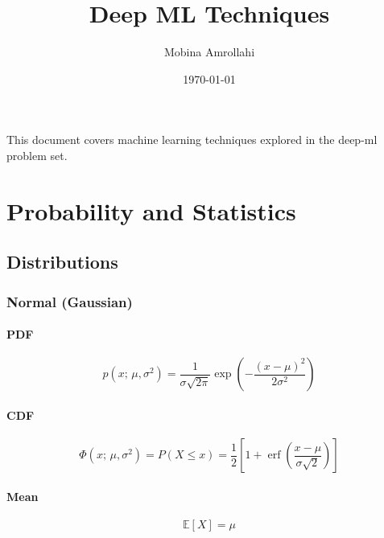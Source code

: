 \documentclass{article}
\title{Deep ML Techniques}
\author{Mobina Amrollahi}
\date{\today}
\begin{document}
\maketitle

\tableofcontents

This document covers machine learning techniques explored in the deep-ml problem set.

\section{Probability and Statistics}
\label{sec:prob-stat}

\subsection{Distributions}
\label{subsec:prob-stat:dist}

\subsubsection{Normal (Gaussian)}
\label{subsubsec:prob-stat:dist:norm}

\paragraph{PDF}
\label{para:prob-stat:dist:norm:pdf}
\begin{equation}
    \label{eq:norm-pdf}
    p(x;\, \mu, \sigma^2) = \frac{1}{\sigma\sqrt{2\pi}}\exp\!\left(-\frac{(x-\mu)^2}{2\sigma^2}\right)
\end{equation}

\paragraph{CDF}
\label{para:prob-stat:dist:norm:cdf}
\begin{equation}
    \label{eq:norm-cdf}
    \Phi(x;\, \mu, \sigma^2) = P(X \leq x) = \frac{1}{2}\left[1 + \operatorname{erf}\!\left(\frac{x - \mu}{\sigma\sqrt{2}}\right)\right]
\end{equation}

\paragraph{Mean}
\label{para:prob-stat:dist:norm:mean}
\begin{equation}
    \label{eq:norm-mean}
    \mathbb{E}[X] = \mu
\end{equation}
\end{document}
